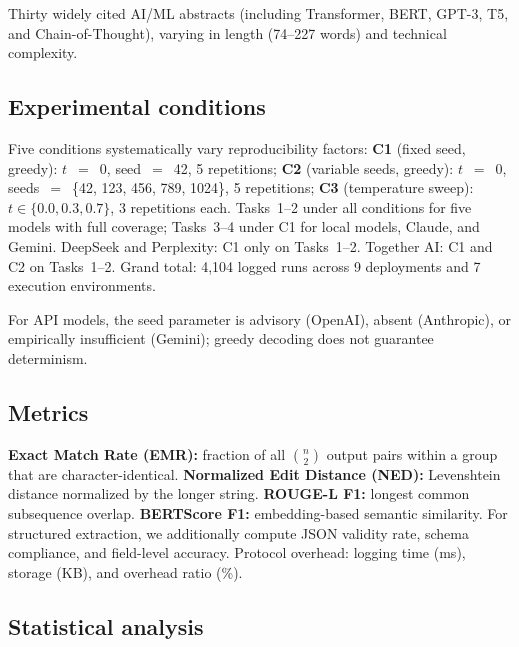 \documentclass[sn-nature]{sn-jnl}
\begin{document}
Thirty widely cited AI/ML abstracts (including Transformer, BERT, GPT-3, T5, and Chain-of-Thought\cite{vaswani2017attention,devlin2019bert,brown2020language,raffel2020exploring,wei2022chain}), varying in length (74--227 words) and technical complexity.


\subsection{Experimental conditions}\label{subsec:conditions}

Five conditions systematically vary reproducibility factors:
\textbf{C1} (fixed seed, greedy): $t$~$=$~0, seed~$=$~42, 5 repetitions;
\textbf{C2} (variable seeds, greedy): $t$~$=$~0, seeds~$=$~\{42, 123, 456, 789, 1024\}, 5 repetitions;
\textbf{C3} (temperature sweep): $t \in \{0.0, 0.3, 0.7\}$, 3 repetitions each.
Tasks~1--2 under all conditions for five models with full coverage; Tasks~3--4 under C1 for local models, Claude, and Gemini.
DeepSeek and Perplexity: C1 only on Tasks~1--2.
Together AI: C1 and C2 on Tasks~1--2.
Grand total: 4,104 logged runs across 9 deployments and 7 execution environments.

For API models, the seed parameter is advisory (OpenAI\cite{openai2024seed}), absent (Anthropic), or empirically insufficient (Gemini); greedy decoding does not guarantee determinism\cite{ouyang2024nondeterminism}.


\subsection{Metrics}\label{subsec:metrics}

\textbf{Exact Match Rate (EMR):} fraction of all $\binom{n}{2}$ output pairs within a group that are character-identical.
\textbf{Normalized Edit Distance (NED):} Levenshtein distance\cite{levenshtein1966binary} normalized by the longer string.
\textbf{ROUGE-L F1:} longest common subsequence overlap\cite{lin2004rouge}.
\textbf{BERTScore F1:} embedding-based semantic similarity\cite{zhang2020bertscore}.
For structured extraction, we additionally compute JSON validity rate, schema compliance, and field-level accuracy.
Protocol overhead: logging time (ms), storage (KB), and overhead ratio (\%).


\subsection{Statistical analysis}\label{subsec:stats}
\end{document}
